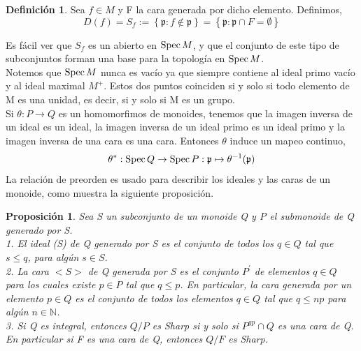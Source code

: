 \documentclass[12pt,spanish]{amsart}
\newcommand{\bb}[1]{\mathbb{#1}}
\newcommand{\fk}[1]{\mathfrak{#1}}
\newcommand{\set}[1]{\left\{{#1}\right\}}
\def\Spec{\mathop{\mbox{\normalfont Spec}}\nolimits}
\newtheorem{prop}[Theorem]{Proposición}
\theoremstyle{definition}
\newtheorem{Def}[Theorem]{Definición}
\theoremstyle{remark}
\begin{document}
\begin{Def}
Sea $f\in M$ y F la cara generada por dicho elemento. Definimos,
$$D(f)=S_{f}:=\set{\fk{p}:f\notin \fk{p}} = \set{\fk{p}:\fk{p} \cap F=\emptyset}$$
\end{Def}

Es fácil ver que $S_{f}$ es un abierto en $\Spec{M}$, y que el conjunto de este tipo de subconjuntos forman una base para la topología en $\Spec{M}$. \\
Notemos que $\Spec{M}$ nunca es vacío ya que siempre contiene al ideal primo vacío y al ideal maximal $M^{+}$. Estos dos puntos coinciden si y solo si todo elemento de M es una unidad, es decir, si y solo si M es un grupo.  \\ 
Si $\theta:P\to Q$ es un homomorfimos de monoides, tenemos que la imagen inversa de un ideal es un ideal, la imagen inversa de un ideal primo es un ideal primo y la imagen inversa de una cara es una cara. Entonces $\theta$ induce un mapeo continuo,
$$\theta^{\ast}:\Spec{Q} \to \Spec{P}: \fk{p} \mapsto \theta^{-1}(\fk{p})$$
La relación de preorden es usado para describir los ideales y las caras de un monoide, como muestra la siguiente proposición. 

\begin{prop}
Sea S un subconjunto de un monoide Q y P el submonoide de Q generado por S. \\
1. El ideal (S) de Q generado por S es el conjunto de todos los $q\in Q$ tal que $s\leq q$, para algún $s\in S$. \\ 
2. La cara $<S>$ de Q generada por S es el conjunto $P^{\prime}$ de elementos $q\in Q$ para los cuales existe $p\in P$ tal que $q\leq p$. En particular, la cara generada por un elemento $p\in Q$ es el conjunto de todos los elementos $q\in Q$ tal que $q\leq np$ para algún $n\in \bb{N}$. \\ 
3. Si Q es \textit{integral}, entonces $Q/P$ es \textit{Sharp} si y solo si $P^{gp}\cap Q$ es una cara de Q. En particular si F es una cara de Q, entonces $Q/F$ es \textit{Sharp}. 
\end{prop}
\end{document}
